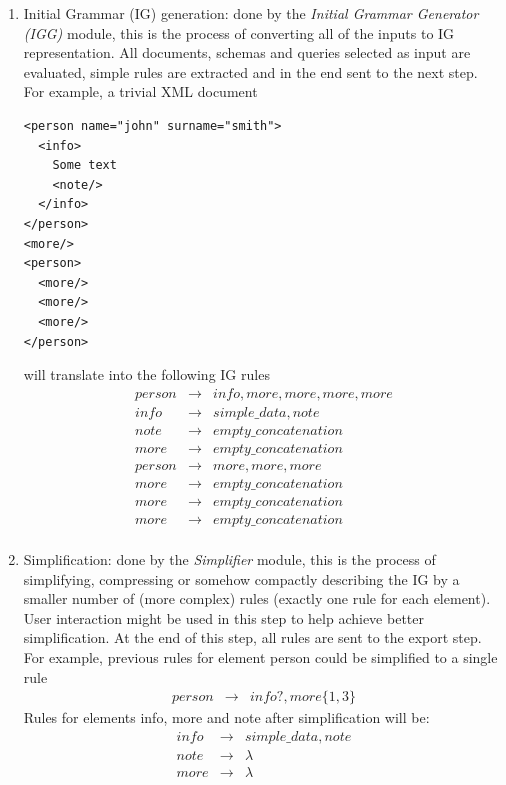 \documentclass[a4paper,10pt,oneside]{article}
\newcommand{\jmodule}[1]{\emph{#1}}
\begin{document}
\begin{enumerate}
	\item Initial Grammar (IG) generation: done by the \jmodule{Initial Grammar Generator (IGG)} module, this is the process of converting all of the inputs to IG representation. All documents, schemas and queries selected as input are evaluated, simple rules are extracted and in the end sent to the next step.\\
	For example, a trivial XML document
	\label{example_inference_xml}
	\begin{verbatim}
<person name="john" surname="smith">
  <info>
    Some text
    <note/>
  </info>
</person>
<more/>
<person>
  <more/>
  <more/>
  <more/>
</person>
  \end{verbatim}
	will translate into the following IG rules
	\begin{eqnarray*}
		person & \to & \mathit{info}, more, more, more, more \\
		\mathit{info} & \to & simple\_data, note \\
		note & \to & empty\_concatenation \\
		more & \to & empty\_concatenation \\
		person & \to & more, more, more \\
		more & \to & empty\_concatenation \\
		more & \to & empty\_concatenation \\
		more & \to & empty\_concatenation \\
	\end{eqnarray*}
	\item Simplification: done by the \jmodule{Simplifier} module, this is the process of simplifying, compressing or somehow compactly describing the IG by a smaller number of (more complex) rules (exactly one rule for each element). User interaction might be used in this step to help achieve better simplification. At the end of this step, all rules are sent to the export step.\\
	For example, previous rules for element person could be simplified to a single rule
	\begin{eqnarray*}
		person & \to & \mathit{info}?, more\{1, 3\}
	\end{eqnarray*}
	Rules for elements info, more and note after simplification will be:
	\begin{eqnarray*}
		\mathit{info} & \to & simple\_data, note \\
		note & \to & \lambda \\
		more & \to & \lambda

\end{eqnarray*}
\end{enumerate}
\end{document}
